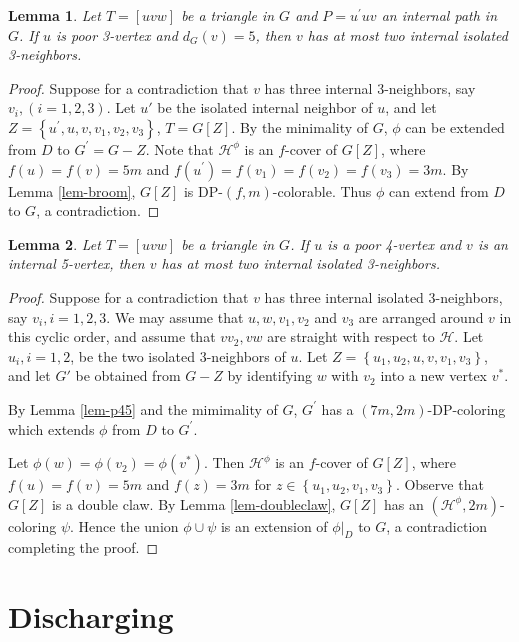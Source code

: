 \documentclass{article}
\newtheorem{lemma}{Lemma}
\begin{document}
\begin{lemma}
\label{lem:14}
Let $T=[uvw]$ be a triangle in $G$ and $P=u^{\prime}uv$ an internal path in $G$. If $u$ is poor 3-vertex and  $d_G(v)=5$, then $v$ has at most two internal isolated 3-neighbors.
\end{lemma}
\begin{proof}
    Suppose for a contradiction that $v$ has three internal 3-neighbors, say $v_i, (i=1,2,3)$. Let $u'$ be the isolated internal neighbor of $u$, and let  $Z=\left\{u^{\prime},u,v,v_1,v_2,v_3 \right\}$, $T=G[Z]$. By the minimality of $G$, $\phi$ can be extended from $D$ to $G^{\prime}=G-Z$.  Note that $\mathcal{H}^{\phi}$ is an $f$-cover of $G[Z]$, where   $f(u)=f(v)=5m$ and $f(u^{\prime})=f(v_1)=f(v_2)=f(v_3)=3m$. By Lemma \ref{lem-broom}, $G[Z]$ is DP-$(f,m)$-colorable. Thus $\phi$ can extend from $D$ to $G$, a contradiction. 
\end{proof}

\begin{lemma}
\label{lem:15}
    Let $T=[uvw]$ be a triangle in $G$. If $u$ is a poor 4-vertex and $v$ is an internal 5-vertex, then $v$ has at most two internal isolated 3-neighbors.
\end{lemma}

\begin{proof}
    Suppose for a contradiction that $v$ has three internal isolated 3-neighbors, say $v_i, i=1,2,3$. We may assume that $u,w,v_1,v_2$ and $v_3$ are arranged around $v$ in this cyclic order, and assume that $vv_2, vw$ are straight with respect to  $\mathcal{H}$.
    Let $u_i,i=1,2$, be the two isolated 3-neighbors of $u$. Let $Z=\left \{ u_1,u_2,u,v,v_1,v_3 \right \} $,
    and let $G'$ be obtained from $G-Z$ by identifying  $w$ with $v_2$ into a new vertex $v^*$. 
\par
    By Lemma \ref{lem-p45} and the mimimality of $G$, $G^{\prime}$ has a $(7m,2m)$-DP-coloring which extends $\phi$ from $D$ to $G^{\prime}$. 
    
    Let $\phi(w)=\phi(v_2)=\phi(v^*)$. Then $\mathcal{H}^{\phi}$ is an $f$-cover of $G[Z]$, where $f(u)=f(v)=5m$ and $f(z)=3m$ for $z\in \left \{ u_1,u_2,v_1,v_3 \right \} $. Observe that $G[Z]$ is a double claw. By Lemma \ref{lem-doubleclaw}, $G[Z]$ has an $(\mathcal{H}^{\phi},2m)$-coloring $\psi$. Hence the union $\phi \cup \psi$ is an extension of $\phi|_D$ to $G$, a contradiction completing the proof.
\end{proof}

\section{Discharging}
\label{sec-discharging}
\end{document}
